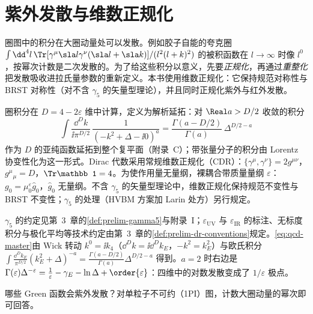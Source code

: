 \section{紫外发散与维数正规化}\label{sec:qcd-regularization}

圈图中的积分在大圈动量处可以发散。例如胶子自能的夸克圈 $\int\dd^4l\,\Tr[\gamma^\mu\sla l\gamma^\nu(\sla l+\sla k)]/(l^2(l+k)^2)$ 的被积函数在 $l\to\infty$ 时像 $l^0$，按幂次计数是二次发散的。为了给这些积分以意义，先要\emph{正规化}，再通过\emph{重整化}把发散吸收进拉氏量参数的重新定义。本书使用维数正规化：它保持规范对称性与 BRST 对称性（对不含 $\gamma_5$ 的矢量型理论），并且同时正规化紫外与红外发散。

\begin{definition}[维数正规化]\label{def:qcd-dimreg}
圈积分在 $D=4-2\varepsilon$ 维中计算，定义为解析延拓：对 $\Real a>D/2$ 收敛的积分
\begin{equation}\label{eq:qcd-master}
\int\frac{\dd^Dk}{\ii\pi^{D/2}}\,\frac1{(-k^2+\Delta-\ii0)^a}=\frac{\Gamma(a-D/2)}{\Gamma(a)}\,\Delta^{D/2-a}
\end{equation}
作为 $D$ 的亚纯函数延拓到整个复平面（附录~C）；带张量分子的积分由 Lorentz 协变性化为这一形式。Dirac 代数采用常规维数正规化（CDR）：$\{\gamma^\mu,\gamma^\nu\}=2g^{\mu\nu}$，$g^\mu{}_\mu=D$，$\Tr\mathbb 1=4$。为使作用量无量纲，裸耦合带质量量纲 $\varepsilon$：$g_0=\mu_0^\varepsilon\hat g_0$，$\hat g_0$ 无量纲。不含 $\gamma_5$ 的矢量型理论中，维数正规化保持规范不变性与 BRST 不变性；$\gamma_5$ 的处理（HVBM 方案加 Larin 处方）另行规定。
\end{definition}

$\gamma_5$ 的约定见第~3~章的\cref{def:prelim-gamma5}与附录~I；$\varepsilon_{\mathrm{UV}}$ 与 $\varepsilon_{\mathrm{IR}}$ 的标注、无标度积分与极化平均等技术约定由第~3~章的\cref{def:prelim-dr-conventions}规定。\cref{eq:qcd-master}由 Wick 转动 $k^0=\ii k_4$（$\dd^Dk=\ii\dd^Dk_E$，$-k^2=k_E^2$）与欧氏积分 $\int\frac{\dd^Dk_E}{\pi^{D/2}}(k_E^2+\Delta)^{-a}=\frac{\Gamma(a-D/2)}{\Gamma(a)}\Delta^{D/2-a}$ 得到。$a=2$ 时右边是 $\Gamma(\varepsilon)\Delta^{-\varepsilon}=\frac1\varepsilon-\gamma_E-\ln\Delta+\order{\varepsilon}$：四维中的对数发散变成了 $1/\varepsilon$ 极点。

哪些 Green 函数会紫外发散？对单粒子不可约（1PI）图，计数大圈动量的幂次即可回答。

